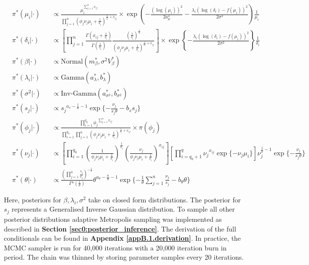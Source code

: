 \begingroup
\addtolength{\jot}{0.8em}
\begin{align*} \label{eq::FullCond}
&\pi^*(\mu_i|\cdot) && \propto \frac{\mu_i^{\sum_{j=1}^n{}x_{ij}}}{\prod_{j=1}^n{}(\phi_j\nu_j\mu_i+\frac{1}{\delta_i})^{\frac{1}{\delta_i}+x_{ij}}}\times{}\exp\left(-\frac{(\log(\mu_i))^2}{2a_\mu^2}-\frac{\lambda_i(\log(\delta_i)-f(\mu_i))^2}{2\sigma^2}\right)\frac{1}{\mu_i} \\
&\pi^*(\delta_i|\cdot) && \propto \left[\prod_{j=1}^n\frac{\Gamma(x_{ij}+\frac{1}{\delta_i})}{\Gamma(\frac{1}{\delta_i})}\frac{(\frac{1}{\delta_i})^{\frac{1}{\delta_i}}}{(\phi_j\nu_j\mu_i+\frac{1}{\delta_i})^{\frac{1}{\delta_i}+x_{ij}}}\right]\times{}\exp\left\lbrace-\frac{\lambda_i(\log(\delta_i)-f(\mu_i))^2}{2\sigma^2}\right\rbrace\frac{1}{\delta_i}\\
&\pi^*(\beta|\cdot)&&\propto{}\text{Normal}(m^*_\beta,\sigma^2V^*_\beta)\\
&\pi^*(\lambda_i|\cdot)&&\propto{}\text{Gamma}(a^*_\lambda,b^*_\lambda)\\
&\pi^*(\sigma^2|\cdot)&&\propto{}\text{Inv-Gamma}(a^*_{\sigma^2},b^*_{\sigma^2})\\
&\pi^*(s_j|\cdot)&&\propto{}s_j{}^{a_s-\frac{1}{\theta}-1}\exp\lbrace-\frac{\nu_j}{s_j\theta}-b_ss_j\rbrace\\
&\pi^*(\phi_j|\cdot)&&\propto{}\frac{\prod_{i=1}^{q_0}\phi_j{}^{\sum_{j=1}^nx_{ij}}}{\prod_{i=1}^{q_0}\prod_{j=1}^{n}(\phi_j\nu_j\mu_i+\frac{1}{\delta_i})^{\frac{1}{\delta_i}+x_{ij}}}\times{}\pi(\phi_j)\\
&\pi^*(\nu_j|\cdot)&&\propto{}\left[\prod_{i=1}^{q_0}\left(\frac{1}{\phi_j\nu_j\mu_i+\frac{1}{\delta_i}}\right)^\frac{1}{\delta_i}\left(\frac{\nu_j}{\phi_j\nu_j\mu_i+\frac{1}{\delta_i}}\right)^{x_{ij}}\right]\left[\prod_{i=q_0+1}^{q}\nu_j{}^{x_{ij}}\exp\lbrace-\nu_j\mu_i\rbrace\right]\nu_j^{\frac{1}{\theta}-1}\exp\lbrace-\frac{\nu_j}{s_j\theta}\rbrace\\
&\pi^*(\theta|\cdot)&&\propto{}\frac{\left(\prod_{j=1}^{n}\frac{s_j}{\nu_j}\right)^{-\frac{1}{\theta}}}{\Gamma{}^n(\frac{1}{\theta})}\theta^{a_\theta-\frac{n}{\theta}-1}\exp\lbrace-\frac{1}{\theta}\sum_{j=1}^n\frac{\nu_j}{s_j}-b_\theta\theta\rbrace
\end{align*}
\endgroup

Here, posteriors for $\beta, \lambda_i, \sigma^2$ take on closed form distributions. 
The posterior for $s_j$ represents a Generalised Inverse Gaussian distribution. 
To sample all other posterior distributions adaptive Metropolis sampling was implemented as described in \textbf{Section \ref{sec0:posterior_inference}}. 
The derivation of the full conditionals can be found in \textbf{Appendix  \ref{appB.1.derivation}}. 
In practice, the MCMC sampler is run for 40,000 iterations with a 20,000 iteration burn in period. 
The chain was thinned by storing parameter samples every 20 iterations.

